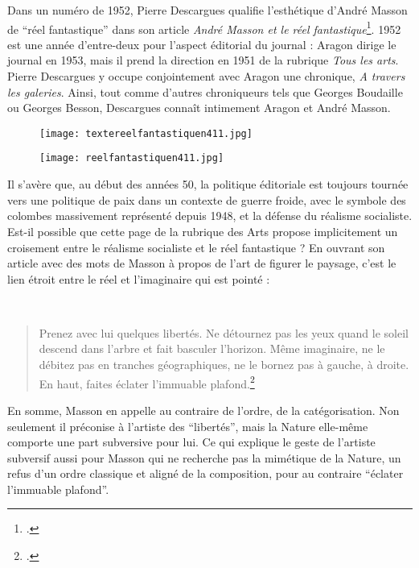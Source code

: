Dans un numéro de 1952, Pierre Descargues qualifie l’esthétique d’André Masson de \enquote{réel fantastique} dans son article \emph{André Masson et le réel fantastique}\footcite{reelfantastique}. 1952 est une année d’entre-deux pour l’aspect éditorial du journal : Aragon dirige le journal en 1953, mais il prend la direction en 1951 de la rubrique \emph{Tous les arts}. Pierre Descargues y occupe conjointement avec Aragon une chronique, \emph{A travers les galeries}. Ainsi, tout comme d’autres chroniqueurs tels que Georges Boudaille ou Georges Besson, Descargues connaît intimement Aragon et André Masson. 

\begin{figure}[H]
   \centering
   \texttt{[image: textereelfantastiquen411.jpg]}
	\caption{\cite{reelfantastique}}\label{fig:Articlereelfantastique}
\end{figure}

\begin{figure}[H]
   \centering
   \texttt{[image: reelfantastiquen411.jpg]}
	\caption{\cite{reelfantastique}}\label{fig:Imagereelfantastique}
\end{figure}


	Il s'avère que, au début des années 50, la politique éditoriale est toujours tournée vers une politique de paix dans un contexte de guerre froide, avec le symbole des colombes massivement représenté depuis 1948, et la défense du réalisme socialiste. Est-il possible que cette page de la rubrique des Arts propose implicitement un croisement entre le réalisme socialiste et le réel fantastique ? En ouvrant son article avec des mots de Masson à propos de l’art de figurer le paysage, c’est le lien étroit entre le réel et l’imaginaire qui est pointé : 

 \begin{quote}
Prenez avec lui quelques libertés. Ne détournez pas les yeux quand le soleil descend dans l’arbre et fait basculer l’horizon. Même imaginaire, ne le débitez pas en tranches géographiques, ne le bornez pas à gauche, à droite. En haut, faites éclater l’immuable plafond.\footcite{reelfantastique}\end{quote}

	 En somme, Masson en appelle au contraire de l’ordre, de la catégorisation. Non seulement il préconise à l’artiste des \enquote{libertés}, mais la Nature elle-même comporte une part subversive pour lui. Ce qui explique le geste de l’artiste subversif aussi pour Masson qui ne recherche pas la mimétique de la Nature, un refus d’un ordre classique et aligné de la composition, pour au contraire \enquote{éclater l’immuable plafond}.

